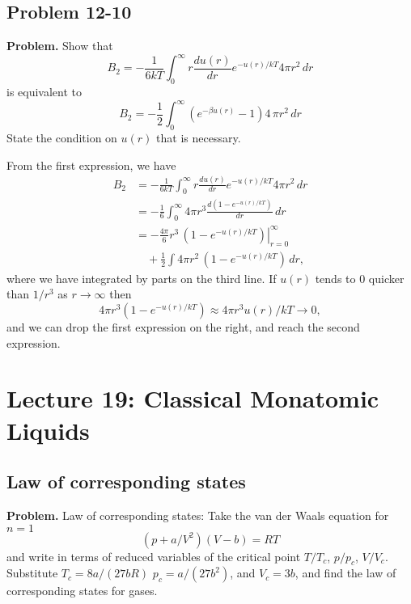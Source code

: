 \documentclass[twocolumn, 10pt]{article}
\numberwithin{equation}{section}
\newenvironment{problem}
{\par\medskip \color{problue}
  \textbf{Problem. }\ignorespaces}
{\medskip}
\newenvironment{solution}[1][\empty]
{\par\medskip\sffamily
  \textbf{\ifx\empty#1{Solution.}\relax\else{#1}\fi} \ignorespaces}
{\medskip}
\begin{document}
\subsection{Problem 12-10}

\begin{problem}
  Show that
  $$
  B_2 =
  -\frac{1}{6kT}
  \int_0^\infty
  r \frac{ du(r) } { dr } e^{-u(r)/kT} 4 \pi r^2 \, dr
  $$
  is equivalent to
  $$
  B_2
  =
  -\frac{1}{2}
  \int_0^\infty
  (e^{-\beta u(r)} - 1)
  4 \, \pi r^2 \, dr
  $$
  State the condition on $u(r)$ that is necessary.
\end{problem}

\begin{solution}
  From the first expression, we have
  \begin{align*}
  B_2 &=
  -\frac{1}{6kT}
  \int_0^\infty
  r \frac{ du(r) } { dr } e^{-u(r)/kT} 4 \pi r^2 \, dr
  \\
    &=
  -\frac{1}{6}
  \int_0^\infty
    4 \pi r^3 \frac{ d(1- e^{-u(r)/kT}) } { dr } \, dr
  \\
  &=
  \left.
    -\frac{ 4 \pi }{6} r^3 \, (1- e^{-u(r)/kT})
  \right|_{r=0}^{\infty}
  \\
  &\quad
    +
  \frac{1}{2}
  \int 4 \pi r^2 \, (1- e^{-u(r)/kT}) \, dr
  ,
  \end{align*}
  where we have integrated by parts on the third line.
  If $u(r)$ tends to $0$ quicker than $1/r^3$ as $r \to \infty$
  then
  $$
  4\pi r^3 (1 - e^{-u(r)/kT}) \approx 4 \pi r^3 u(r)/kT \to 0,
  $$
  and we can drop the first expression on the right,
  and reach the second expression.
\end{solution}

\section{Lecture 19: Classical Monatomic Liquids}

\subsection{Law of corresponding states}

\begin{problem}
Law of corresponding states:
Take the van der Waals equation for $n = 1$
$$
\left( p + a/V^2 \right)(V - b) = RT
$$
and write in terms of reduced variables of
the critical point $T/T_c$, $p/p_c$, $V/V_c$.
%
Substitute
  $T_c = 8a/(27bR)$
  $p_c = a/(27b^2)$,
  and
  $V_c = 3b$,
and find the law of corresponding states for gases.
\end{problem}
\end{document}

